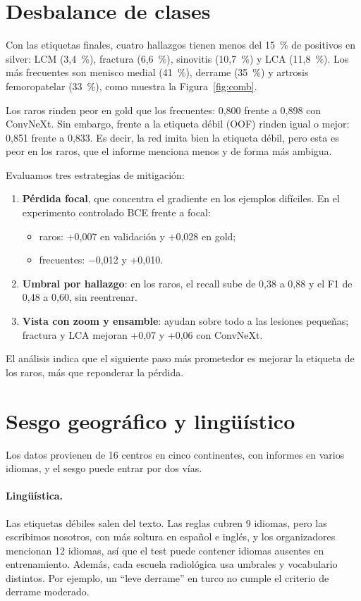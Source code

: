 \documentclass{article}
\begin{document}
\section{Desbalance de clases}

Con las etiquetas finales, cuatro hallazgos tienen menos del 15~\% de positivos en silver: LCM (3,4~\%), fractura (6,6~\%), sinovitis (10,7~\%) y LCA (11,8~\%). Los más frecuentes son menisco medial (41~\%), derrame (35~\%) y artrosis femoropatelar (33~\%), como muestra la Figura~\ref{fig:comb}.

Los raros rinden peor en gold que los frecuentes: 0,800 frente a 0,898 con ConvNeXt. Sin embargo, frente a la etiqueta débil (OOF) rinden igual o mejor: 0,851 frente a 0,833. Es decir, la red imita bien la etiqueta débil, pero esta es peor en los raros, que el informe menciona menos y de forma más ambigua.

Evaluamos tres estrategias de mitigación:
\begin{enumerate}
  \item \textbf{Pérdida focal}, que concentra el gradiente en los ejemplos difíciles. En el experimento controlado BCE frente a focal:
  \begin{itemize}
    \item raros: +0,007 en validación y +0,028 en gold;
    \item frecuentes: $-$0,012 y +0,010.
  \end{itemize}
  \item \textbf{Umbral por hallazgo}: en los raros, el recall sube de 0,38 a 0,88 y el F1 de 0,48 a 0,60, sin reentrenar.
  \item \textbf{Vista con zoom y ensamble}: ayudan sobre todo a las lesiones pequeñas; fractura y LCA mejoran +0,07 y +0,06 con ConvNeXt.
\end{enumerate}
El análisis indica que el siguiente paso más prometedor es mejorar la etiqueta de los raros, más que reponderar la pérdida.

\section{Sesgo geográfico y lingüístico}

Los datos provienen de 16 centros en cinco continentes, con informes en varios idiomas, y el sesgo puede entrar por dos vías.

\paragraph{Lingüística.} Las etiquetas débiles salen del texto. Las reglas cubren 9 idiomas, pero las escribimos nosotros, con más soltura en español e inglés, y los organizadores mencionan 12 idiomas, así que el test puede contener idiomas ausentes en entrenamiento. Además, cada escuela radiológica usa umbrales y vocabulario distintos. Por ejemplo, un ``leve derrame'' en turco no cumple el criterio de derrame moderado.
\end{document}
